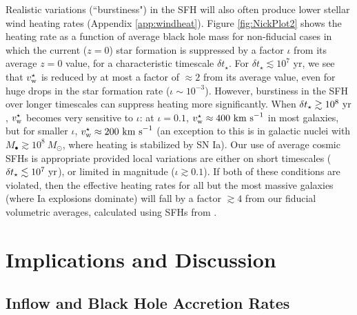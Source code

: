 \documentclass[usenatbib,fleqn]{mn2e}
\begin{document}
Realistic variations (``burstiness") in the SFH will also often
produce lower stellar wind heating rates (Appendix
\ref{app:windheat}).  Figure \ref{fig:NickPlot2} shows the heating
rate as a function of average black hole mass for non-fiducial cases
in which the current ($z = 0$) star formation is suppressed by a
factor $\iota$ from its average $z = 0$ value, for a characteristic
timescale $\delta t_{\star}$.  For $\delta t_{\star} \lesssim 10^{7}$
yr, we see that $v_{\rm w}^{\star}$ is reduced by at most a factor of
$\approx 2$ from its average value, even for huge drops in the star
formation rate ($\iota \sim 10^{-3}$).  However, burstiness in the SFH
over longer timescales can suppress heating more significantly.  When
$\delta t_{\star} \gtrsim 10^8~{\rm yr}$, $v_{\rm w}^\star$ becomes
very sensitive to $\iota$: at $\iota=0.1$, $v_{\rm w}^\star \approx
400~{\rm km~s}^{-1}$ in most galaxies, but for smaller $\iota$,
$v_{\rm w}^\star \approx 200~{\rm km~s}^{-1}$ (an exception to this is
in galactic nuclei with $M_\bullet \gtrsim 10^8~M_\odot$, where
heating is stabilized by SN Ia).  Our use of average cosmic SFHs is
appropriate provided local variations are either on short timescales
($\delta t_{\star} \lesssim 10^7~{\rm yr}$), or limited in magnitude
($\iota \gtrsim 0.1$).  If both of these conditions are violated, then
the effective heating rates for all but the most massive galaxies
(where Ia explosions dominate) will fall by a factor $\gtrsim 4$ from
our fiducial volumetric averages, calculated using SFHs from
\citet{MosterNaab+:2013a}.


\section{Implications and Discussion}
\label{sec:discussion}

\subsection{Inflow and Black Hole Accretion Rates}
\label{sec:mdot}
\end{document}
